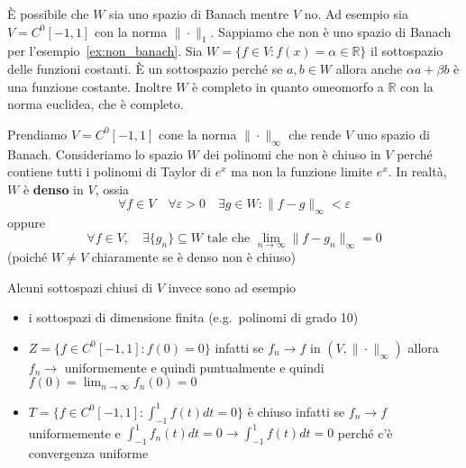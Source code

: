 \begin{example}
    È possibile che \(W\) sia uno spazio di Banach mentre \(V\) no. Ad esempio
    sia \(V = C^{0}[-1, 1]\) con la norma \(\|\cdot \|_1\). Sappiamo che non è
    uno spazio di Banach per l'esempio~\ref{ex:non_banach}. Sia \(W = \{f \in V
    : f{(x)} = \alpha \in \mathbb{R} \} \) il sottospazio delle funzioni
    costanti. È un sottospazio perché se \(a, b \in  W\) allora anche
    \(\alpha a + \beta b\) è una funzione costante. Inoltre \(W\) è completo in
    quanto omeomorfo a \(\mathbb{R}\) con la norma euclidea, che è completo.
\end{example}

\begin{example}
    Prendiamo \(V = C^{0}[-1, 1]\) cone la norma \(\|\cdot \|_\infty\) che rende
    \(V\) uno spazio di Banach. Consideriamo lo spazio \(W\) dei polinomi che
    non è chiuso in \(V\) perché contiene tutti i polinomi di Taylor di
    \(e^{x}\) ma non la funzione limite \(e^{x}\). In realtà, \(W\) è
    \textbf{denso} in \(V\), ossia
    \[
        \forall f \in V \quad \forall \varepsilon > 0 \quad \exists g \in W :
        \| f - g\|_\infty < \varepsilon
    \]
    oppure 
    \[
        \forall f \in V, \quad \exists \{g_{n}\} \subseteq W \text{ tale che }
        \lim_{n \to \infty} \| f - g_{n}\|_\infty = 0
    \]
    (poiché \(W \neq V\) chiaramente se è denso non è chiuso) 

    Alcuni sottospazi chiusi di \(V\) invece sono ad esempio
\begin{itemize}[label = --]
    \item i sottospazi di dimensione finita (e.g.~polinomi di grado 10)
    \item \(Z = \{f \in C^{0}[-1, 1]: f{(0)} = 0\}  \) infatti se \(f_{n} \to
        f\) in \({(V, \|\cdot \|_\infty)}\) allora \(f_{n} \to \) uniformemente
        e quindi puntualmente e quindi \(f{(0)} = \lim_{n \to \infty} f_{n}{(0)}
        = 0\)
\item \(T = \{f \in C^{0}[-1, 1] : \int_{-1}^{1} f{(t)}dt = 0\}  \) è chiuso
        infatti se \(f_{n} \to f\) uniformemente e \(\int_{-1}^{1} f_{n}{(t)}dt
        = 0 \to \int_{-1}^{1}f{(t)}dt = 0\) perché c'è convergenza uniforme
\end{itemize}
\end{example}

\newpage
